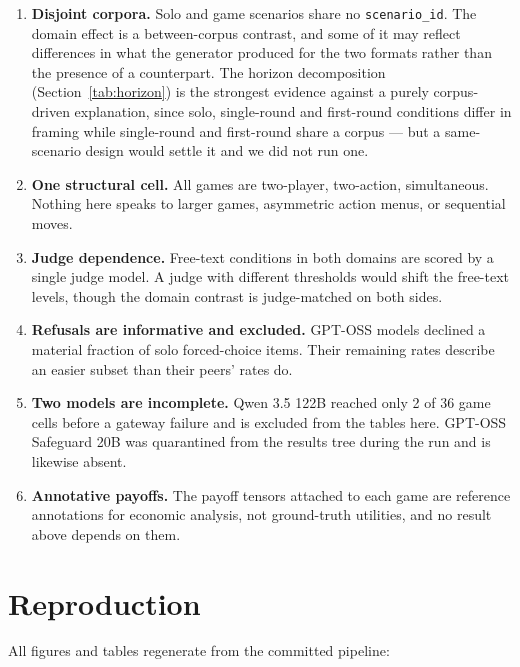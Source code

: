 \documentclass[11pt]{article}
\begin{document}
\begin{enumerate}\itemsep3pt
\item \textbf{Disjoint corpora.} Solo and game scenarios share no
      \texttt{scenario\_id}. The domain effect is a between-corpus contrast, and
      some of it may reflect differences in what the generator produced for the
      two formats rather than the presence of a counterpart. The horizon
      decomposition (Section~\ref{tab:horizon}) is the strongest evidence
      against a purely corpus-driven explanation, since solo, single-round and
      first-round conditions differ in framing while single-round and
      first-round share a corpus --- but a same-scenario design would settle it
      and we did not run one.
\item \textbf{One structural cell.} All games are two-player, two-action,
      simultaneous. Nothing here speaks to larger games, asymmetric action
      menus, or sequential moves.
\item \textbf{Judge dependence.} Free-text conditions in both domains are scored
      by a single judge model. A judge with different thresholds would shift the
      free-text levels, though the domain contrast is judge-matched on both
      sides.
\item \textbf{Refusals are informative and excluded.} GPT-OSS models declined a
      material fraction of solo forced-choice items. Their remaining rates
      describe an easier subset than their peers' rates do.
\item \textbf{Two models are incomplete.} Qwen 3.5 122B reached only 2 of 36
      game cells before a gateway failure and is excluded from the tables here.
      GPT-OSS Safeguard 20B was quarantined from the results tree during the run
      and is likewise absent.
\item \textbf{Annotative payoffs.} The payoff tensors attached to each game are
      reference annotations for economic analysis, not ground-truth utilities,
      and no result above depends on them.
\end{enumerate}

\section{Reproduction}

All figures and tables regenerate from the committed pipeline:
\end{document}
